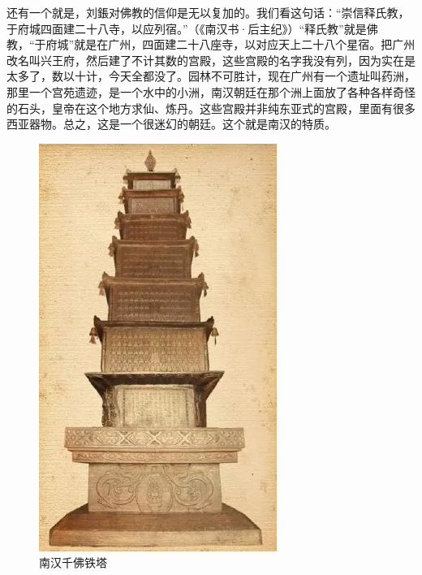 还有一个就是，刘鋹对佛教的信仰是无以复加的。我们看这句话：“崇信释氏教，于府城四面建二十八寺，以应列宿。”（《南汉书·后主纪》）“释氏教”就是佛教，“于府城”就是在广州，四面建二十八座寺，以对应天上二十八个星宿。把广州改名叫兴王府，然后建了不计其数的宫殿，这些宫殿的名字我没有列，因为实在是太多了，数以十计，今天全都没了。园林不可胜计，现在广州有一个遗址叫药洲，那里一个宫苑遗迹，是一个水中的小洲，南汉朝廷在那个洲上面放了各种各样奇怪的石头，皇帝在这个地方求仙、炼丹。这些宫殿并非纯东亚式的宫殿，里面有很多西亚器物。总之，这是一个很迷幻的朝廷。这个就是南汉的特质。

\begin{figure}
	\centering
	\includegraphics[width=\textwidth]{images/image-31}
	\caption{南汉千佛铁塔}
\end{figure}

